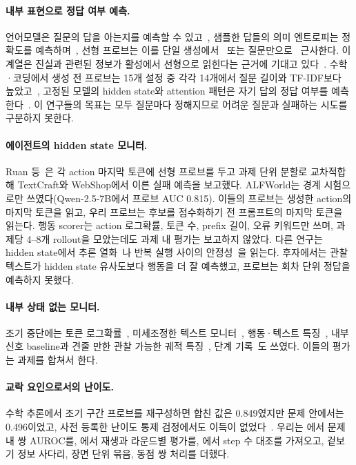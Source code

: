 \documentclass[10pt]{article}
\begin{document}
\paragraph{내부 표현으로 정답 여부 예측.} 언어모델은 질문의 답을 아는지를 예측할 수 있고~\cite{kadavath2022know}, 샘플한 답들의 의미 엔트로피는 정확도를 예측하며~\cite{kuhn2023semantic}, 선형 프로브는 이를 단일 생성에서~\cite{kossen2024sep} 또는 질문만으로~\cite{moreno2026noanswer} 근사한다.
이 계열은 진실과 관련된 정보가 활성에서 선형으로 읽힌다는 근거에 기대고 있다~\cite{burns2022latent,marks2023geometry}. 수학·코딩에서 생성 전 프로브는 15개 설정 중 각각 14개에서 질문 길이와 TF-IDF보다 높았고~\cite{lugoloobi2026failures}, 고정된 모델의 hidden state와 attention 패턴은 자기 답의 정답 여부를 예측한다~\cite{ghasemabadi2025gnosis}.
이 연구들의 목표는 모두 질문마다 정해지므로 어려운 질문과 실패하는 시도를 구분하지 못한다.

\paragraph{에이전트의 hidden state 모니터.} Ruan 등~\cite{ruan2026doomed}은 각 action 마지막 토큰에 선형 프로브를 두고 과제 단위 분할로 교차적합해 TextCraft와 WebShop에서 이른 실패 예측을 보고했다. ALFWorld는 경계 시험으로만 쓰였다(Qwen-2.5-7B에서 프로브 AUC 0.815). 이들의 프로브는 생성한 action의 마지막 토큰을 읽고, 우리 프로브는 후보를 점수화하기 전 프롬프트의 마지막 토큰을 읽는다.
행동 scorer는 action 로그확률, 토큰 수, prefix 길이, 오류 키워드만 쓰며, 과제당 4--8개 rollout을 모았는데도 과제 내 평가는 보고하지 않았다.
다른 연구는 hidden state에서 추론 열화~\cite{khan2026companion}나 반복 실행 사이의 안정성~\cite{mehta2026commit}을 읽는다. 후자에서는 관찰 텍스트가 hidden state 유사도보다 행동을 더 잘 예측했고, 프로브는 회차 단위 정답을 예측하지 못했다.

\paragraph{내부 상태 없는 모니터.} 조기 중단에는 토큰 로그확률~\cite{pham2026agentstop}, 미세조정한 텍스트 모니터~\cite{wang2026failfast}, 행동·텍스트 특징~\cite{shi2026earlyeval}, 내부 신호 baseline과 견줄 만한 관찰 가능한 궤적 특징~\cite{pan2026monitoring}, 단계 기록~\cite{dubey2026realtime}도 쓰였다. 이들의 평가는 과제를 합쳐서 한다.

\paragraph{교락 요인으로서의 난이도.} 수학 추론에서 조기 구간 프로브를 재구성하면 합친 값은 0.849였지만 문제 안에서는 0.496이었고, 사전 등록한 난이도 통제 검정에서도 이득이 없었다~\cite{bulut2026problem}. 우리는 \cite{bulut2026problem}에서 문제 내 쌍 AUROC를, \cite{ruan2026doomed}에서 재생과 라운드별 평가를, \cite{wang2026failfast}에서 step 수 대조를 가져오고, 겉보기 정보 사다리, 장면 단위 묶음, 동점 쌍 처리를 더했다.
\end{document}

